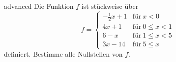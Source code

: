 \documentclass[../lineare_gleichungen.tex]{subfiles}
\begin{document}
\begin{exercise}{advanced}
    Die Funktion $f$ ist stückweise über
    \[f=\begin{cases}
        -\frac{1}{2}x+1 & \text{für}~x<0\\
        4x+1 & \text{für}~0\leq x<1\\
        6-x & \text{für}~1\leq x<5\\
        3x-14 & \text{für}~5\leq x
    \end{cases}\]
    definiert. Bestimme alle Nullstellen von $f$.
\end{exercise}
\end{document}
